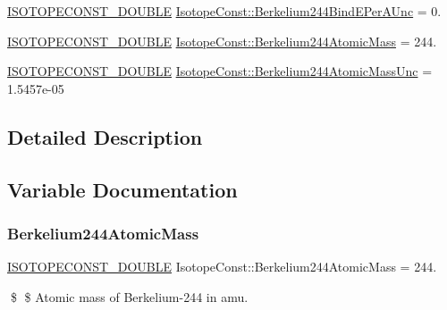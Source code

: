 \begin{DoxyCompactItemize}
\mbox{\hyperlink{group___isotope_const-_macros_ga8f45a7272ce02c0b4c65c44636ed719a}{I\+S\+O\+T\+O\+P\+E\+C\+O\+N\+S\+T\+\_\+\+D\+O\+U\+B\+LE}} \mbox{\hyperlink{group___isotope_const-_berkelium-_bk244_ga1959a1a9f1001929ac52e7039ee2b086}{Isotope\+Const\+::\+Berkelium244\+Bind\+E\+Per\+A\+Unc}} = 0.
\item 
\mbox{\hyperlink{group___isotope_const-_macros_ga8f45a7272ce02c0b4c65c44636ed719a}{I\+S\+O\+T\+O\+P\+E\+C\+O\+N\+S\+T\+\_\+\+D\+O\+U\+B\+LE}} \mbox{\hyperlink{group___isotope_const-_berkelium-_bk244_ga2cf458e7fe5732b09e5992791b7a30e7}{Isotope\+Const\+::\+Berkelium244\+Atomic\+Mass}} = 244.
\item 
\mbox{\hyperlink{group___isotope_const-_macros_ga8f45a7272ce02c0b4c65c44636ed719a}{I\+S\+O\+T\+O\+P\+E\+C\+O\+N\+S\+T\+\_\+\+D\+O\+U\+B\+LE}} \mbox{\hyperlink{group___isotope_const-_berkelium-_bk244_gac4dccc74af003b7f466634c7e58d38d5}{Isotope\+Const\+::\+Berkelium244\+Atomic\+Mass\+Unc}} = 1.\+5457e-\/05
\end{DoxyCompactItemize}


\subsection{Detailed Description}


\subsection{Variable Documentation}
\mbox{\label{group___isotope_const-_berkelium-_bk244_ga2cf458e7fe5732b09e5992791b7a30e7}} 
\subsubsection{\texorpdfstring{Berkelium244\+Atomic\+Mass}{Berkelium244AtomicMass}}
{\footnotesize\ttfamily \mbox{\hyperlink{group___isotope_const-_macros_ga8f45a7272ce02c0b4c65c44636ed719a}{I\+S\+O\+T\+O\+P\+E\+C\+O\+N\+S\+T\+\_\+\+D\+O\+U\+B\+LE}} Isotope\+Const\+::\+Berkelium244\+Atomic\+Mass = 244.}

\$ \$ Atomic mass of Berkelium-\/244 in amu. \mbox{\label{group___isotope_const-_berkelium-_bk244_gac4dccc74af003b7f466634c7e58d38d5}} 
